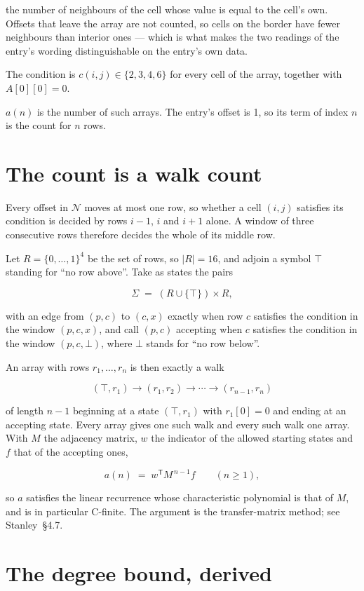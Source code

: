 \documentclass[11pt]{article}
\theoremstyle{definition}
\begin{document}
the number of neighbours of the cell whose value is equal to the cell's own. Offsets that leave the array are not counted, so cells on the border have fewer neighbours than interior ones --- which is what makes the two readings of the entry's wording distinguishable on the entry's own data.

The condition is $c(i,j) \in \{2, 3, 4, 6\}$ for every cell of the array, together with $A[0][0]=0$.

$a(n)$ is the number of such arrays. The entry's offset is 1, so its term of index $n$ is the count for $n$ rows.

\section{The count is a walk count}

Every offset in $\mathcal{N}$ moves at most one row, so whether a cell $(i,j)$ satisfies its condition is decided by rows $i-1$, $i$ and $i+1$ alone. A window of three consecutive rows therefore decides the whole of its middle row.

Let $R = \{0,\dots,1\}^{4}$ be the set of rows, so $|R| = 16$, and adjoin a symbol $\top$ standing for ``no row above''. Take as states the pairs

\[\Sigma \;=\; (R \cup \{\top\}) \times R,\]

with an edge from $(p,c)$ to $(c,x)$ exactly when row $c$ satisfies the condition in the window $(p,c,x)$, and call $(p,c)$ accepting when $c$ satisfies the condition in the window $(p,c,\bot)$, where $\bot$ stands for ``no row below''.

An array with rows $r_1,\dots,r_n$ is then exactly a walk

\[(\top,r_1) \to (r_1,r_2) \to \cdots \to (r_{n-1},r_n)\]

of length $n-1$ beginning at a state $(\top,r_1)$ with $r_1[0]=0$ and ending at an accepting state. Every array gives one such walk and every such walk one array. With $M$ the adjacency matrix, $w$ the indicator of the allowed starting states and $f$ that of the accepting ones,

\[a(n) \;=\; w^{\mathsf T} M^{\,n-1} f \qquad (n \ge 1),\]

so $a$ satisfies the linear recurrence whose characteristic polynomial is that of $M$, and is in particular C-finite. The argument is the transfer-matrix method; see Stanley~\S4.7.

\section{The degree bound, derived}
\end{document}
